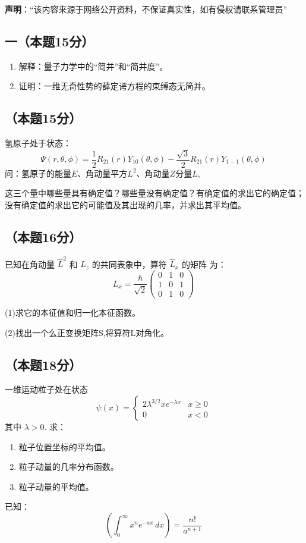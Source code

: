 
\textbf{声明}：“该内容来源于网络公开资料，不保证真实性，如有侵权请联系管理员”

\subsection{一（本题15分）}
\begin{enumerate}
\item 解释：量子力学中的“简并”和“简并度”。
\item 证明：一维无奇性势的薛定谔方程的束缚态无简并。
\end{enumerate}

\subsection{（本题15分）}
氢原子处于状态：
$$\Psi(r, \theta, \phi) = \frac{1}{2} R_{21}(r) Y_{10}(\theta, \phi) - \frac{\sqrt{3}}{2} R_{21}(r) Y_{1-1}(\theta, \phi)~$$
问：氢原子的能量$E$、角动量平方$L^2$、角动量$Z$分量$L$,

这三个量中哪些量具有确定值？哪些量没有确定值？有确定值的求出它的确定值；没有确定值的求出它的可能值及其出现的几率，并求出其平均值。

\subsection{（本题16分）}
已知在角动量 $\hat{L}^2$ 和 $\hat{L}_z$ 的共同表象中，算符 $\hat{L}_x$ 的矩阵
为：$$L_x = \frac{\hbar}{\sqrt{2}} \begin{pmatrix}
0 & 1 & 0 \\
1 & 0 & 1 \\
0 & 1 & 0
\end{pmatrix}~$$

(1)求它的本征值和归一化本征函数。

(2)找出一个么正变换矩阵S,将算符L对角化。

\subsection{（本题18分）}
一维运动粒子处在状态
$$\psi(x) = 
\begin{cases} 
2\lambda^{3/2} x e^{-\lambda x} &  x \geq 0 \\
0 &  x < 0
\end{cases}~$$
其中 $\lambda > 0$. 求：
\begin{enumerate}
    \item 粒子位置坐标的平均值。
    \item 粒子动量的几率分布函数。
    \item 粒子动量的平均值。
\end{enumerate}
已知：
$$\left( \int_{0}^{\infty} x^n e^{-ax} \, dx \right) = \frac{n!}{a^{n+1}}~$$

